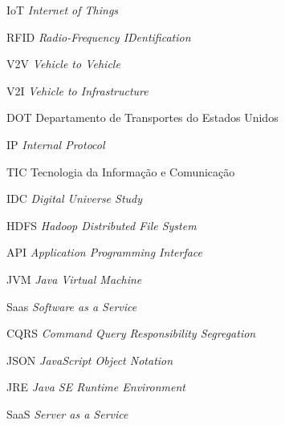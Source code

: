 \begin{siglas}
  \item[IoT] \textit{Internet of Things}
  \item[RFID] \textit{Radio-Frequency IDentification}
  \item[V2V] \textit{Vehicle to Vehicle}
  \item[V2I] \textit{Vehicle to Infrastructure}
  \item[DOT] Departamento de Transportes do Estados Unidos
  \item[IP]  \textit{Internal Protocol}
  \item[TIC] Tecnologia da Informação e Comunicação
  \item[IDC] \textit{Digital Universe Study}
  \item[HDFS] \textit{Hadoop Distributed File System}
  \item[API] \textit{Application Programming Interface}
  \item[JVM] \textit{Java Virtual Machine}
  \item[Saas] \textit{Software as a Service}
  \item[CQRS] \textit{Command Query Responsibility Segregation}
  \item[JSON] \textit{JavaScript Object Notation}
  \item[JRE] \textit{Java SE Runtime Environment}
  \item[SaaS] \textit{Server as a Service}
\end{siglas}